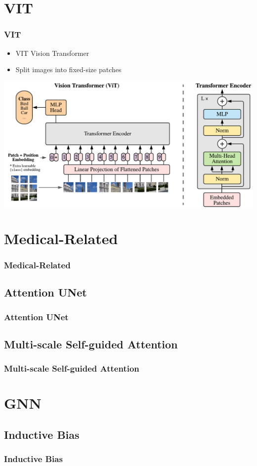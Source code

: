 \documentclass[]{beamer}
\begin{document}
\section{VIT}
\begin{frame}
    \frametitle{VIT}
    \begin{itemize}
        \item VIT\: Vision Transformer
        \item Split images into fixed-size patches
    \end{itemize}
    \centering
    \includegraphics[scale = 0.4]{model_scheme.pdf}
\end{frame}

\section{Medical-Related}
\begin{frame}
    \frametitle{Medical-Related}
\end{frame}

\subsection{Attention UNet}
\begin{frame}
    \frametitle{Attention UNet}
\end{frame}

\subsection{Multi-scale Self-guided Attention}
\begin{frame}
    \frametitle{Multi-scale Self-guided Attention}
\end{frame}

\section{GNN}
\subsection{Inductive Bias}
\begin{frame}
    \frametitle{Inductive Bias}
\end{frame}
\end{document}
